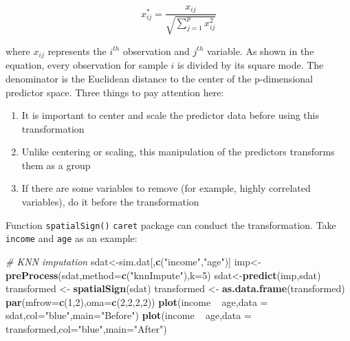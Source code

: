 \documentclass[12pt,]{krantz}
\newenvironment{Shaded}{\begin{snugshade}}{\end{snugshade}}
\newcommand{\KeywordTok}[1]{\textcolor[rgb]{0.13,0.29,0.53}{\textbf{{#1}}}}
\newcommand{\DataTypeTok}[1]{\textcolor[rgb]{0.13,0.29,0.53}{{#1}}}
\newcommand{\DecValTok}[1]{\textcolor[rgb]{0.00,0.00,0.81}{{#1}}}
\newcommand{\StringTok}[1]{\textcolor[rgb]{0.31,0.60,0.02}{{#1}}}
\newcommand{\CommentTok}[1]{\textcolor[rgb]{0.56,0.35,0.01}{\textit{{#1}}}}
\newcommand{\NormalTok}[1]{{#1}}
\providecommand{\tightlist}{%
  \setlength{\itemsep}{0pt}\setlength{\parskip}{0pt}}
\theoremstyle{definition}
\theoremstyle{definition}
\theoremstyle{remark}
\begin{document}
\[x_{ij}^{*}=\frac{x_{ij}}{\sqrt{\sum_{j=1}^{p}x_{ij}^{2}}}\]

where \(x_{ij}\) represents the \(i^{th}\) observation and \(j^{th}\)
variable. As shown in the equation, every observation for sample \(i\)
is divided by its square mode. The denominator is the Euclidean distance
to the center of the p-dimensional predictor space. Three things to pay
attention here:

\begin{enumerate}
\def\labelenumi{\arabic{enumi}.}
\tightlist
\item
  It is important to center and scale the predictor data before using
  this transformation
\item
  Unlike centering or scaling, this manipulation of the predictors
  transforms them as a group
\item
  If there are some variables to remove (for example, highly correlated
  variables), do it before the transformation
\end{enumerate}

Function \texttt{spatialSign()} \texttt{caret} package can conduct the
transformation. Take \texttt{income} and \texttt{age} as an example:

\begin{Shaded}
\begin{Highlighting}[]
\CommentTok{# KNN imputation}
\NormalTok{sdat<-sim.dat[,}\KeywordTok{c}\NormalTok{(}\StringTok{"income"}\NormalTok{,}\StringTok{"age"}\NormalTok{)]}
\NormalTok{imp<-}\KeywordTok{preProcess}\NormalTok{(sdat,}\DataTypeTok{method=}\KeywordTok{c}\NormalTok{(}\StringTok{"knnImpute"}\NormalTok{),}\DataTypeTok{k=}\DecValTok{5}\NormalTok{)}
\NormalTok{sdat<-}\KeywordTok{predict}\NormalTok{(imp,sdat)}
\NormalTok{transformed <-}\StringTok{ }\KeywordTok{spatialSign}\NormalTok{(sdat)}
\NormalTok{transformed <-}\StringTok{ }\KeywordTok{as.data.frame}\NormalTok{(transformed)}
\KeywordTok{par}\NormalTok{(}\DataTypeTok{mfrow=}\KeywordTok{c}\NormalTok{(}\DecValTok{1}\NormalTok{,}\DecValTok{2}\NormalTok{),}\DataTypeTok{oma=}\KeywordTok{c}\NormalTok{(}\DecValTok{2}\NormalTok{,}\DecValTok{2}\NormalTok{,}\DecValTok{2}\NormalTok{,}\DecValTok{2}\NormalTok{))}
\KeywordTok{plot}\NormalTok{(income ~}\StringTok{ }\NormalTok{age,}\DataTypeTok{data =} \NormalTok{sdat,}\DataTypeTok{col=}\StringTok{"blue"}\NormalTok{,}\DataTypeTok{main=}\StringTok{"Before"}\NormalTok{)}
\KeywordTok{plot}\NormalTok{(income ~}\StringTok{ }\NormalTok{age,}\DataTypeTok{data =} \NormalTok{transformed,}\DataTypeTok{col=}\StringTok{"blue"}\NormalTok{,}\DataTypeTok{main=}\StringTok{"After"}\NormalTok{)}
\end{Highlighting}
\end{Shaded}
\end{document}
